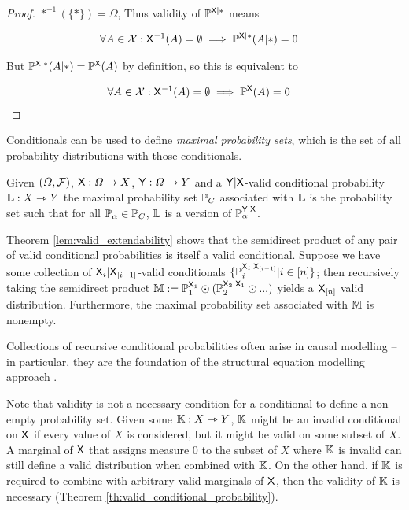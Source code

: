 \begin{proof}
$*^{-1} (\{*\})=\Omega$, Thus validity of $\mathbb{P}^{\mathsf{X}|*}$ means 

\begin{align}
    \forall A\in \mathcal{X}: \mathsf{X}^{-1}( A)=\emptyset \implies \mathbb{P}^{\mathsf{X}|*}(A|*)&=0
\end{align}

But $\mathbb{P}^{\mathsf{X}|*}(A|*)=\mathbb{P}^{\mathsf{X}}(A)$ by definition, so this is equivalent to

\begin{align}
    \forall A\in \mathcal{X}: \mathsf{X}^{-1}( A)=\emptyset \implies \mathbb{P}^{\mathsf{X}}(A)&=0
\end{align}
\end{proof}

Conditionals can be used to define \emph{maximal probability sets}, which is the set of all probability distributions with those conditionals.

\begin{definition}
Given $(\Omega,\mathcal{F})$, $\mathsf{X}:\Omega\to X$, $\mathsf{Y}:\Omega\to Y$ and a $\mathsf{Y}|\mathsf{X}$-valid conditional probability $\mathbb{L}:X\rightarrowtriangle Y$ the maximal probability set $\mathbb{P}_C$ associated with $\mathbb{L}$ is the probability set such that for all $\mathbb{P}_\alpha\in \mathbb{P}_C$, $\mathbb{L}$ is a version of $\mathbb{P}_\alpha^{\mathsf{Y}|\mathsf{X}}$.
\end{definition}

Theorem \ref{lem:valid_extendability} shows that the semidirect product of any pair of valid conditional probabilities is itself a valid conditional. Suppose we have some collection of $\mathsf{X}_i|\mathsf{X}_{[i-1]}$-valid conditionals $\{\mathbb{P}_i^{\mathsf{X}_i|\mathsf{X}_{[i-1]}}|i\in [n]\}$; then recursively taking the semidirect product $\mathbb{M}:=\mathbb{P}_1^{\mathsf{X}_1}\odot (\mathbb{P}_2^{\mathsf{X}_2|\mathsf{X}_{1}}\odot ...)$ yields a $\mathsf{X}_{[n]}$ valid distribution. Furthermore, the maximal probability set associated with $\mathbb{M}$ is nonempty.

Collections of recursive conditional probabilities often arise in causal modelling -- in particular, they are the foundation of the structural equation modelling approach \citet{richardson2013single,pearl_causality:_2009}.

Note that validity is not a necessary condition for a conditional to define a non-empty probability set. Given some $\mathbb{K}:X\rightarrowtriangle Y$, $\mathbb{K}$ might be an invalid conditional on $\mathsf{X}$ if every value of $X$ is considered, but it might be valid on some subset of $X$. A marginal of $\mathsf{X}$ that assigns measure 0 to the subset of $X$ where $\mathbb{K}$ is invalid can still define a valid distribution when combined with $\mathbb{K}$. On the other hand, if $\mathbb{K}$ is required to combine with arbitrary valid marginals of $\mathsf{X}$, then the validity of $\mathbb{K}$ is necessary (Theorem \ref{th:valid_conditional_probability}).

